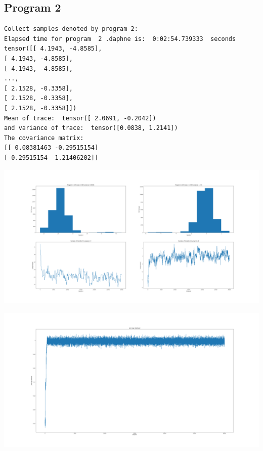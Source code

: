 \documentclass[]{article}
\begin{document}
\subsection{Program 2}
\begin{verbatim}
Collect samples denoted by program 2:
Elapsed time for program  2 .daphne is:  0:02:54.739333  seconds
tensor([[ 4.1943, -4.8585],
[ 4.1943, -4.8585],
[ 4.1943, -4.8585],
...,
[ 2.1528, -0.3358],
[ 2.1528, -0.3358],
[ 2.1528, -0.3358]])
Mean of trace:  tensor([ 2.0691, -0.2042])  
and variance of trace:  tensor([0.0838, 1.2141])
The covariance matrix:  
[[ 0.08381463 -0.29515154]
[-0.29515154  1.21406202]]
\end{verbatim}
\begin{center}
	\includegraphics[width=\linewidth]{Figures/p2_MHGibbs.png}
\end{center}
\begin{center}
	\includegraphics[width=\linewidth]{Figures/p2_MHGibbsjll.png}
\end{center}
\end{document}
